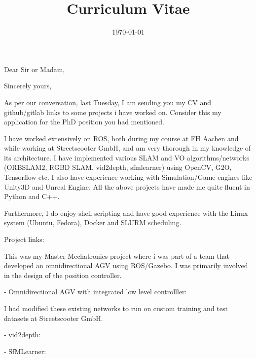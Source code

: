 \documentclass[11pt,a4paper,roman]{moderncv} %
\title{\Large{Curriculum Vitae}}
\begin{document}


\clearpage

\date{\today} %
\opening{Dear Sir or Madam,} %
\closing{Sincerely yours,} %

\makelettertitle %

As per our conversation, last Tuesday, I am sending you my CV and github/gitlab links to some projects i have worked on. 
Consider this my application for the PhD position you had mentioned.

I have worked extensively on ROS, both during my course at FH Aachen and while working at Streetscooter GmbH, 
and am very thorough in my knowledge of its architecture. 
I have implemented various SLAM and VO algorithms/networks (ORBSLAM2, RGBD SLAM, vid2depth, sfmlearner) using OpenCV, G2O, Tensorflow etc. I also have experience working with Simulation/Game engines like Unity3D and Unreal Engine. All the above projects have made me quite fluent in Python and C++.


Furthermore, I do enjoy shell scripting and have good experience with the 
Linux system (Ubuntu, Fedora), Docker and SLURM scheduling.


Project links:


This was my Master Mechatronics project where i was part of a team 
that developed an omnidirectional AGV using ROS/Gazebo. I was primarily 
involved in the design of the position controller.

- Omnidirectional AGV with integrated low level controlller: 


I had modified these existing networks to run on custom training and 
test datasets at Streetscooter GmbH.

-  vid2depth: 

- SfMLearner: 
\end{document}
